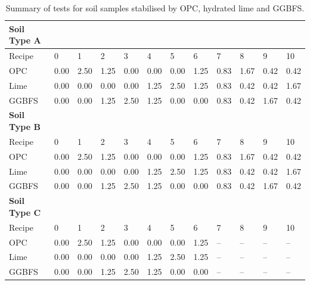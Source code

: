 \documentclass[electronics,article,accept,pdftex,moreauthors]{Definitions/mdpi}
\begin{document}
\begin{table}[H]\small\setlength{\tabcolsep}{2.54mm}
\caption{Summary {of tests for soil samples} stabilised by {OPC, hydrated} lime and {GGBFS}.} \label{tab:1}
    \begin{tabular}{llllllllllll}
    \toprule
        \textbf{Soil Type A} & ~ & ~ & ~ & ~ & ~ & ~ & ~ & ~ & ~ &\\
        \midrule
        Recipe & 0 & 1 & 2 & 3 & 4 & 5 & 6 & 7 & 8 & 9 & 10 \\ 
 
        OPC & 0.00 & 2.50 & 1.25 & 0.00 & 0.00 & 0.00 & 1.25 & 0.83 & 1.67 & 0.42 & 0.42 \\ 
        Lime & 0.00 & 0.00 & 0.00 & 0.00 & 1.25 & 2.50 & 1.25 & 0.83 & 0.42 & 0.42 & 1.67 \\ 
        GGBFS & 0.00 & 0.00 & 1.25 & 2.50 & 1.25 & 0.00 & 0.00 & 0.83 & 0.42 & 1.67 & 0.42 \\  \midrule
        \textbf{Soil Type B} & ~ & ~ & ~ & ~ & ~ & ~ & ~ & ~ & ~ & ~  \\ 
        \midrule
        Recipe & 0 & 1 & 2 & 3 & 4 & 5 & 6 & 7 & 8 & 9 & 10 \\ 
        OPC & 0.00 & 2.50 & 1.25 & 0.00 & 0.00 & 0.00 & 1.25 & 0.83 & 1.67 & 0.42 & 0.42 \\ 
        Lime & 0.00 & 0.00 & 0.00 & 0.00 & 1.25 & 2.50 & 1.25 & 0.83 & 0.42 & 0.42 & 1.67 \\ 
        GGBFS & 0.00 & 0.00 & 1.25 & 2.50 & 1.25 & 0.00 & 0.00 & 0.83 & 0.42 & 1.67 & 0.42 \\  \midrule
        \textbf{Soil Type C} & ~ & ~ & ~ & ~ & ~ & ~ & ~ & ~ & ~ & ~  \\ 
        \midrule
        Recipe & 0 & 1 & 2 & 3 & 4 & 5 & 6 & 7 & 8 & 9 & 10 \\ 
        OPC & 0.00 & 2.50 & 1.25 & 0.00 & 0.00 & 0.00 & 1.25 & – & – & – & – \\
        Lime & 0.00 & 0.00 & 0.00 & 0.00 & 1.25 & 2.50 & 1.25 & – & – & – & – \\ 
        GGBFS & 0.00 & 0.00 & 1.25 & 2.50 & 1.25 & 0.00 & 0.00 & – & – & – & – \\ 
        \bottomrule
    \end{tabular}
    

\end{table}
\end{document}
